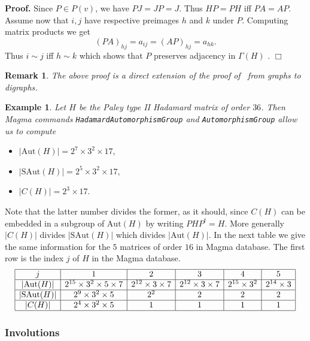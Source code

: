 \documentclass[12pt]{article}
\newenvironment{pf}{\noindent\textbf{Proof.}\quad}{\hfill{$\Box$}}
\newtheorem{rem}{Remark}
\newtheorem{ex}{Example}
\def\Aut{\mathrm{Aut}}
\def\SAut{\mathrm{SAut}}
\begin{document}
\begin{pf}
 Since $P\in P(v)$, we have $PJ=JP=J$.
 Thus $HP=PH$ iff $PA=AP$. Assume now that  $i,j$ have respective preimages  $h$ and $k$ under $P$. Computing matrix products we get
$$(PA)_{hj}=a_{ij}=(AP)_{hj}=a_{hk}. $$
Thus $ i  \sim j$ iff $ h  \sim k$ which shows that $P$ preserves adjacency in $\Gamma(H)$ .
\end{pf}
\begin{rem}
{\em The above proof is a direct extension of the proof of~\cite[Prop.\,15.2]{Biggs:74} from graphs to digraphs.}
\end{rem}
\begin{ex}
{\em Let $H$ be the Paley type II Hadamard matrix of order $36$. Then Magma commands {\tt HadamardAutomorphismGroup} and {\tt AutomorphismGroup} allow us to compute}
\end{ex}
\begin{itemize}
 \item $|\Aut(H)|=2^7\times 3^2 \times 17$,
 \item $|\SAut(H)| = 2^5 \times 3^2 \times 17$,
 \item $|C(H)|=2^3 \times 17$.
\end{itemize}

Note that the latter number divides the former, as it should, since $C(H)$ can be embedded in a subgroup of $\Aut(H)$ by writing $PHP^t=H$.
More generally $ |C(H)|$ divides $|\SAut(H)| $ which divides $|\Aut(H)|$.
In the next table we give the same information for the $5$ matrices of order $16$ in Magma database. The first row is the index $j$ of $H$ in the Magma database.
$$\begin{array}{|c|c|c|c|c|c|} \hline
j&1&2&3&4&5\\ \hline
|\Aut(H)|& 2^{15} \times 3^2 \times 5 \times 7& 2^{12} \times 3 \times 7&2^{12} \times 3 \times 7& 2^{15} \times 3^2&2^{14} \times 3\\ \hline
|\mathrm{SAut}(H)|  & 2^9 \times 3^2 \times 5 & 2^2 & 2 & 2 & 2 \\ \hline

 |C(H)|& 2^4 \times 3^2 \times 5& 1&1&1&1\\ \hline


\end{array}$$

\subsubsection{Involutions}
\end{document}
